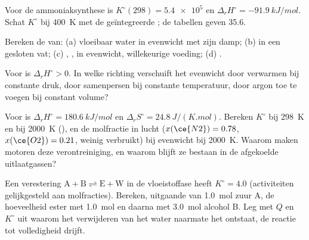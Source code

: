 \begin{exercise}[$\star$]\label{exo:b2:equilibrium-shifts:2}
Voor de ammoniaksynthese is $K^\circ(298) = \num{5.4e5}$ en $\Delta_r H^\circ =
\qty{-91.9}{kJ/mol}$. Schat $K^\circ$ bij \qty{400}{K} met de geïntegreerde
; de tabellen geven 35.6.
\end{exercise}

\begin{exercise}[$\star$]\label{exo:b2:equilibrium-shifts:3}
Bereken de  van: (a) vloeibaar water in evenwicht met zijn damp;
(b)  in een gesloten vat; (c) ,
,  in evenwicht, willekeurige voeding; (d) .
\end{exercise}

\begin{exercise}[$\star$]\label{exo:b2:equilibrium-shifts:4}
Voor  is $\Delta_r H^\circ > 0$. In welke richting verschuift het
evenwicht door verwarmen bij constante druk, door samenpersen bij
constante temperatuur, door argon toe te voegen bij constant volume?
\end{exercise}

\begin{exercise}[$\star\star$]\label{exo:b2:equilibrium-shifts:5}
Voor  is $\Delta_r H^\circ = \qty{180.6}{kJ/mol}$ en
$\Delta_r S^\circ = \qty{24.8}{J/(K.mol)}$. Bereken $K^\circ$ bij \qty{298}{K}
en bij \qty{2000}{K} (), en de molfractie
 in lucht ($x(\ce{N2}) = 0.78$, $x(\ce{O2}) = 0.21$, weinig verbruikt) bij
evenwicht bij \qty{2000}{K}. Waarom maken motoren deze verontreiniging, en waarom
blijft ze bestaan in de afgekoelde uitlaatgassen?
\end{exercise}

\begin{exercise}[$\star\star$]\label{exo:b2:equilibrium-shifts:6}
Een verestering $\mathrm{A + B \rightleftharpoons E + W}$ in de vloeistoffase
heeft $K^\circ = 4.0$ (activiteiten gelijkgesteld aan molfracties). Bereken, uitgaande van
\qty{1.0}{mol} zuur A, de hoeveelheid ester met \qty{1.0}{mol} en daarna met
\qty{3.0}{mol} alcohol B. Leg met $Q$ en $K^\circ$ uit waarom het verwijderen van het
water naarmate het ontstaat, de reactie tot volledigheid drijft.
\end{exercise}

